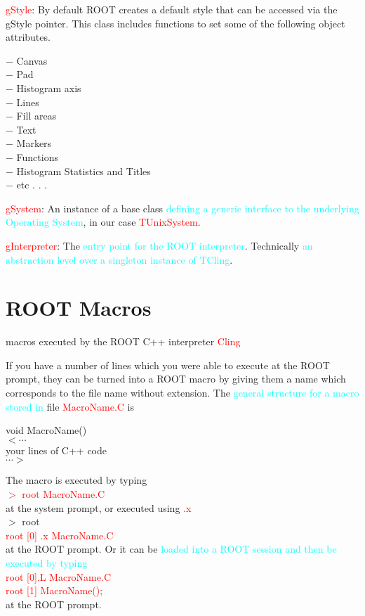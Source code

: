 \documentclass[12pt,a4paper]{article}
\begin{document}
\textcolor{red}{gStyle}: By default ROOT creates a default style that can be accessed via the gStyle pointer. This class includes
functions to set some of the following object attributes.

$-$ Canvas \\
$-$ Pad \\
$-$ Histogram axis \\
$-$ Lines \\
$-$ Fill areas \\
$-$ Text \\
$-$ Markers \\
$-$ Functions \\
$-$ Histogram Statistics and Titles \\
$-$ etc . . .

\textcolor{red}{gSystem}: An instance of a base class \textcolor{cyan}{defining a generic interface to the underlying Operating System}, in our case \textcolor{red}{TUnixSystem}.

\textcolor{red}{gInterpreter}: The \textcolor{cyan}{entry point for the ROOT interpreter}. Technically \textcolor{cyan}{an abstraction level over a singleton instance of TCling}.


\section{ROOT Macros}
macros executed by the ROOT C++ interpreter \textcolor{red}{Cling}

If you have a number of lines which you were able to execute at the ROOT prompt, they can be turned into a ROOT macro by giving them a name which corresponds to the file name without extension. The \textcolor{cyan}{general structure for a macro stored in} file \textcolor{red}{MacroName.C} is

void MacroName() { \\
$< \cdots$ \\
your lines of C++ code \\
$\cdots >$ \\
}

The macro is executed by typing \\
\textcolor{red}{$>$ root MacroName.C} \\
at the system prompt, or executed using \textcolor{red}{.x} \\
$>$ root \\
\textcolor{red}{root [0] .x MacroName.C} \\
at the ROOT prompt. Or it can be \textcolor{cyan}{loaded into a ROOT session and then be executed by typing} \\
\textcolor{red}{root [0].L MacroName.C} \\
\textcolor{red}{root [1] MacroName();} \\
at the ROOT prompt.
\end{document}
